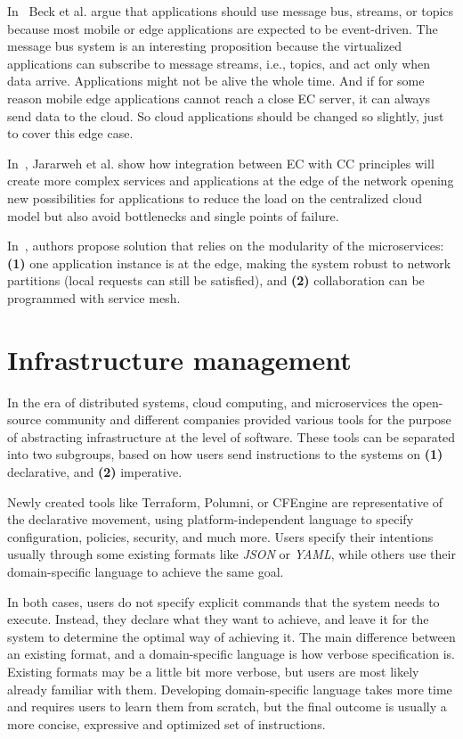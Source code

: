 In~\cite{inproceedingsBeck} Beck et al. argue that applications should use message bus, streams, or topics because most mobile or edge applications are expected to be event-driven. The message bus system is an interesting proposition because the virtualized applications can subscribe to message streams, i.e., topics, and act only when data arrive. Applications might not be alive the whole time. And if for some reason mobile edge applications cannot reach a close EC server, it can always send data to the cloud. So cloud applications should be changed so slightly, just to cover this edge case.

In~\cite{JararwehDAAAB16}, Jararweh et al. show how integration between EC with CC principles will create more complex services and applications at the edge of the network opening new possibilities for applications to reduce the load on the centralized cloud model but also avoid bottlenecks and single points of failure.

In~\cite{cherrueau}, authors propose solution that relies on the modularity of the microservices: \textbf{(1)} one application instance is at the edge, making the system robust to network partitions (local requests can still be satisfied), and \textbf{(2)} collaboration can be programmed with service mesh.
%
%
\section{Infrastructure management}\label{sec:infrastructure_management}
%
In the era of distributed systems, cloud computing, and microservices the open-source community and different companies provided various tools for the purpose of abstracting infrastructure at the level of software. These tools can be separated into two subgroups, based on how users send instructions to the systems on \textbf{(1)} declarative, and \textbf{(2)} imperative.

Newly created tools like Terraform, Polumni, or CFEngine are representative of the declarative movement, using platform-independent language to specify configuration, policies, security, and much more. Users specify their intentions usually through some existing formats like \emph{JSON} or \emph{YAML}, while others use their domain-specific language to achieve the same goal.

In both cases, users do not specify explicit commands that the system needs to execute. Instead, they declare what they want to achieve, and leave it for the system to determine the optimal way of achieving it. The main difference between an existing format, and a domain-specific language is how verbose specification is. Existing formats may be a little bit more verbose, but users are most likely already familiar with them. Developing domain-specific language takes more time and requires users to learn them from scratch, but the final outcome is usually a more concise, expressive and optimized set of instructions.

